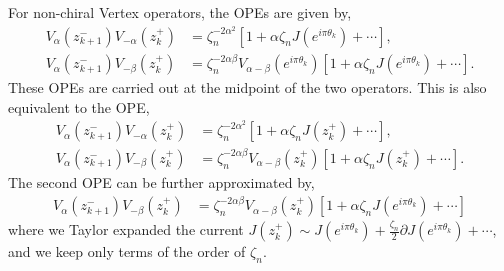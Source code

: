 \documentclass[11pt]{article}
\newcommand{\p}{\partial}
\begin{document}
For non-chiral Vertex operators, the OPEs are given by,
\begin{align}
    V_\alpha(z_{k+1}^-)V_{-\alpha}(z_k^+)&= \zeta_n^{-2\alpha^2} [1 + \alpha \zeta_n J(e^{i\pi \theta_k}) + \cdots],\\
    V_\alpha(z_{k+1}^-)V_{-\beta}(z_k^+) &= \zeta_n^{-2\alpha\beta}V_{\alpha-\beta}(e^{i\pi \theta_k})\left[ 1+ \alpha \zeta_n J(e^{i\pi \theta_k}) + \cdots \right].
\end{align}
These OPEs are carried out at the midpoint of the two operators. This is also equivalent to the OPE,
\begin{align}
    V_\alpha(z_{k+1}^-)V_{-\alpha}(z_k^+) &= \zeta_n^{-2\alpha^2}[1 + \alpha \zeta_n J(z_k^+) + \cdots],\\
    V_\alpha(z_{k+1}^-)V_{-\beta}(z_k^+) &= \zeta_n^{-2\alpha\beta}V_{\alpha-\beta}(z_{k}^+)\left[ 1+ \alpha \zeta_n J(z_k^+) + \cdots \right].
\end{align}
The second OPE can be further approximated by,
\begin{align}
    V_\alpha(z_{k+1}^-)V_{-\beta}(z_k^+) &= \zeta_n^{-2\alpha\beta}V_{\alpha-\beta}(z_{k}^+)\left[ 1+ \alpha \zeta_n J(e^{i \pi \theta_k}) + \cdots \right]
\end{align}
where we Taylor expanded the current $J(z_k^+)\sim J(e^{i\pi \theta_k}) + \frac{\zeta_n}{2}\p J(e^{i\pi\theta_k}) + \cdots$, and we keep only terms of the order of $\zeta_n$.
\end{document}
